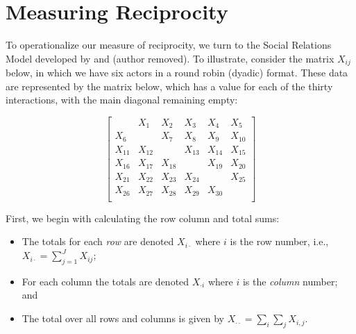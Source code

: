 \section*{Measuring Reciprocity}

To operationalize our measure of reciprocity, we turn to the Social Relations Model developed by \citet{kenny1994interpersonal} and (author removed). To illustrate, consider the matrix $X_{ij}$ below, in which we have six actors in a round robin (dyadic) format. These data are represented by the matrix below, which has a value for each of the thirty interactions, with the main diagonal remaining empty:

\singlespacing
\[
\left[
\begin{array}{cccccc}
 & X_{1}  & X_{2}  & X_{3} & X_{4} & X_{5} \\
X_{6}  &  & X_{7}  & X_{8} & X_{9} & X_{10} \\
X_{11}  & X_{12}  &    & X_{13} & X_{14} & X_{15} \\
X_{16}  & X_{17}  & X_{18}  &  & X_{19} & X_{20} \\
X_{21}  & X_{22}  & X_{23}  & X_{24} &   & X_{25} \\
X_{26}  & X_{27}  & X_{28}  & X_{29} & X_{30} &   \\
\end{array}
\right]
\]

\doublespacing
First, we begin with calculating the row column and total sums:

\begin{itemize}
	\item The totals for each \emph{ row} are denoted $X_{i \cdot}$ where $i$ is the row number, i.e.,
	~\\
	$X_{i \cdot} = \sum_{j=1}^{J} X_{ij}$;
	\item For each column the totals are denoted
	 $X_{\cdot i}$ where $i$ is the \emph{column} number; and 
	 \item The total over all rows and columns is given by $X_{\cdot \cdot} = \sum_i \sum_j X_{i,j}$.
 \end{itemize}
 
